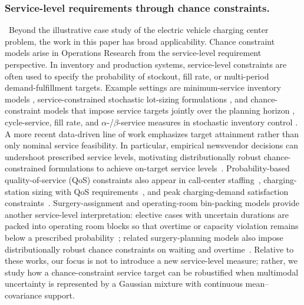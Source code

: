 \documentclass[opre,sglanonrev]{informs4}
\begin{document}
\subsubsection{Service-level requirements through chance constraints.}\,
Beyond the illustrative case study of the electric vehicle charging center problem, the work in this paper has broad applicability. Chance constraint models arise in Operations Research from the service-level requirement perspective. In inventory and production systems, service-level constraints are often used to specify the probability of stockout, fill rate, or multi-period demand-fulfillment targets. Example settings are minimum-service inventory models \cite{chen2001inventory}, service-constrained stochastic lot-sizing formulations \cite{tarim_kingsman_2004}, and chance-constraint models that impose service targets jointly over the planning horizon \cite{rossi2008global}, cycle-service, fill rate, and $\alpha$-/$\beta$-service measures in stochastic inventory control \cite{rossi2013service,jiang2019service}. A more recent data-driven line of work emphasizes target attainment rather than only nominal service feasibility. In particular, empirical newsvendor decisions can undershoot prescribed service levels, motivating distributionally robust chance-constrained formulations to achieve on-target service levels~\cite {van_der_laan2022datadriven}. Probability-based quality-of-service (QoS) constraints also appear in call-center staffing~\cite{dam2022joint}, charging-station sizing with QoS requirements~\cite{khaksari2021sizing}, and peak charging-demand satisfaction constraints~\cite{casini2021chance}. Surgery-assignment and operating-room bin-packing models provide another service-level interpretation: elective cases with uncertain durations are packed into operating room blocks so that overtime or capacity violation remains below a prescribed probability~\cite{Shylo2012StochasticOR, Wang2021ChanceConstrainedBinPacking}; related surgery-planning models also impose distributionally robust chance constraints on waiting and overtime~\cite{Deng2019ChanceConstrainedSurgery}. Relative to these works, our focus is not to introduce a new service-level measure; rather, we study how a chance-constraint service target can be robustified when multimodal uncertainty is represented by a Gaussian mixture with continuous mean--covariance support.
\end{document}
